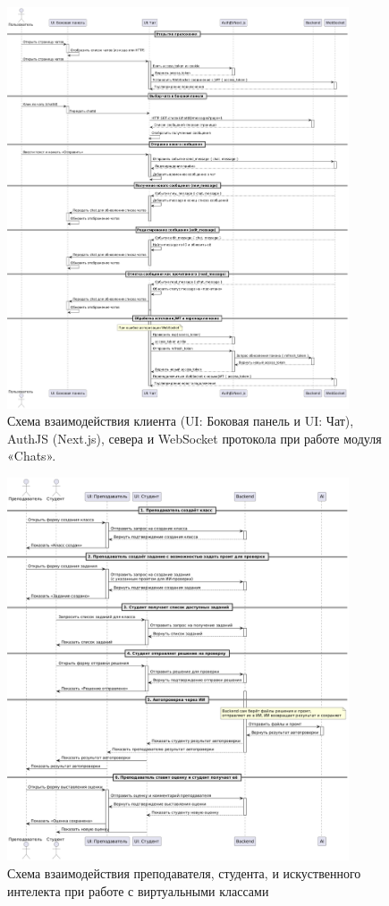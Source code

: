 \begin{figure}[h]
    \centering
    \includegraphics[width=0.9\textwidth]{static/diagrams/Chats.png}
    \caption{Схема взаимодействия клиента (UI: Боковая панель и UI: Чат), AuthJS (Next.js), севера и WebSocket протокола при работе модуля «Chats».}
    \label{fig:chats-flow}
\end{figure}


\begin{figure}[h]
    \centering
    \includegraphics[width=0.9\textwidth]{static/diagrams/Classroom.png}
    \caption{Схема взаимодействия преподавателя, студента, и искуственного интелекта при работе с виртуальными классами}
    \label{fig:classroom-flow}
\end{figure}

